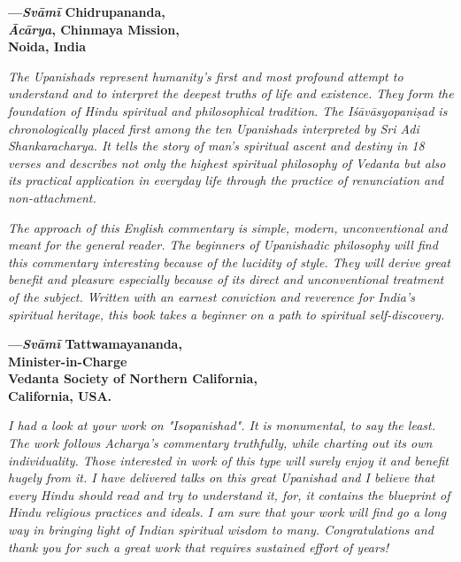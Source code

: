 \begin{flushright}
\textbf{---\emph{Svāmī} Chidrupananda,}\\
\textbf{\emph{Ācārya}, Chinmaya Mission,}\\
\textbf{Noida, India}
\end{flushright}
\medskip

\emph{The Upanishads represent humanity's first and most profound attempt to understand and to interpret the deepest truths of life and existence. They form the foundation of Hindu spiritual and philosophical tradition. The Iśāvāsyopaniṣad is chronologically placed first among the ten Upanishads interpreted by Sri Adi Shankaracharya. It tells the story of man's spiritual ascent and destiny in 18 verses and describes not only the highest spiritual philosophy of Vedanta but also its practical application in everyday life through the practice of renunciation and non-attachment.}

\emph{The approach of this English commentary is simple, modern, unconventional and meant for the general reader. The beginners of Upanishadic philosophy will find this commentary interesting because of the lucidity of style. They will derive great benefit and pleasure especially because of its direct and unconventional treatment of the subject. Written with an earnest conviction and reverence for India's spiritual heritage, this book takes a beginner on a path to spiritual self-discovery.}
\medskip

\begin{flushright}
\textbf{---\emph{Svāmī} Tattwamayananda,}\\
\textbf{Minister-in-Charge}\\
\textbf{Vedanta Society of Northern California,}\\
\textbf{California, USA.}
\end{flushright}
\medskip

\emph{I had a look at your work on "Isopanishad". It is monumental, to say the least. The work follows Acharya's commentary truthfully, while charting out its own individuality. Those interested in work of this type will surely enjoy it and benefit hugely from it. I have delivered talks on this great Upanishad and I believe that every Hindu should read and try to understand it, for, it contains the blueprint of Hindu religious practices and ideals. I am sure that your work will find go a long way in bringing light of Indian spiritual wisdom to many. Congratulations and thank you for such a great work that requires sustained effort of years!}
\medskip

